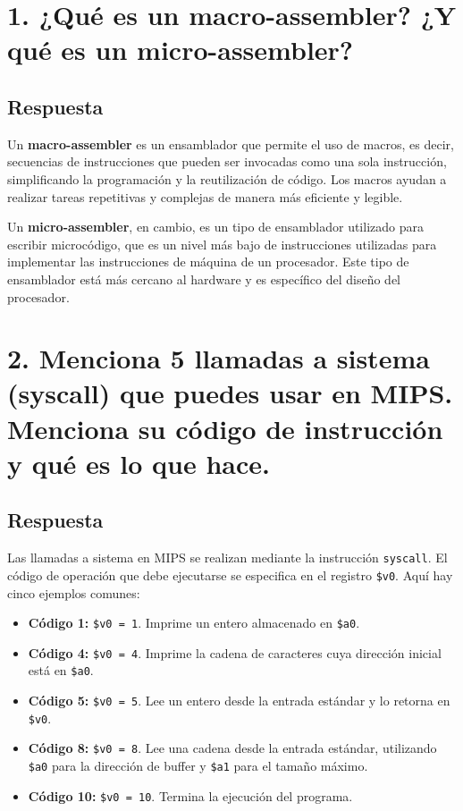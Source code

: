 \documentclass{article}
\begin{document}
\section*{1. ¿Qué es un macro-assembler? ¿Y qué es un micro-assembler?}
\subsection*{Respuesta}
Un \textbf{macro-assembler} es un ensamblador que permite el uso de macros, es decir, secuencias de instrucciones que pueden ser invocadas como una sola instrucción, simplificando la programación y la reutilización de código. Los macros ayudan a realizar tareas repetitivas y complejas de manera más eficiente y legible.

Un \textbf{micro-assembler}, en cambio, es un tipo de ensamblador utilizado para escribir microcódigo, que es un nivel más bajo de instrucciones utilizadas para implementar las instrucciones de máquina de un procesador. Este tipo de ensamblador está más cercano al hardware y es específico del diseño del procesador.

\section*{2. Menciona 5 llamadas a sistema (syscall) que puedes usar en MIPS. Menciona su código de instrucción y qué es lo que hace.}
\subsection*{Respuesta}
Las llamadas a sistema en MIPS se realizan mediante la instrucción \texttt{syscall}. El código de operación que debe ejecutarse se especifica en el registro \texttt{\$v0}. Aquí hay cinco ejemplos comunes:
\begin{itemize}
    \item \textbf{Código 1:} \texttt{\$v0 = 1}. Imprime un entero almacenado en \texttt{\$a0}.
    \item \textbf{Código 4:} \texttt{\$v0 = 4}. Imprime la cadena de caracteres cuya dirección inicial está en \texttt{\$a0}.
    \item \textbf{Código 5:} \texttt{\$v0 = 5}. Lee un entero desde la entrada estándar y lo retorna en \texttt{\$v0}.
    \item \textbf{Código 8:} \texttt{\$v0 = 8}. Lee una cadena desde la entrada estándar, utilizando \texttt{\$a0} para la dirección de buffer y \texttt{\$a1} para el tamaño máximo.
    \item \textbf{Código 10:} \texttt{\$v0 = 10}. Termina la ejecución del programa.
\end{itemize}
\end{document}
